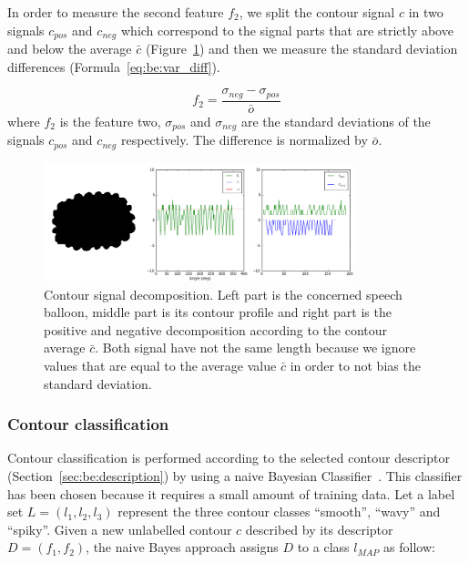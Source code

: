 In order to measure the second feature $f_2$, we split the contour signal $c$ in two signals $c_{pos}$ and $c_{neg}$ which correspond to the signal parts that are strictly above and below the average $\bar{c}$ (Figure~\ref{fig:be:signal_decomposition}) and then we measure the standard deviation differences (Formula~\ref{eq:be:var_diff}).%


\begin{equation}\label{eq:be:var_diff}
 f_2 = \frac{\sigma_{neg} - \sigma_{pos}}{\bar{o} }%
\end{equation}
where $f_2$ is the feature two, $\sigma_{pos}$ and $\sigma_{neg}$ are the standard deviations of the signals $c_{pos}$ and $c_{neg}$ respectively. The difference is normalized by $\bar{o}$.%


	\begin{figure}[!ht]	%
	  \centering
		\includegraphics[trim = 0mm 0mm 0mm 0mm, clip, width=340px]{signal_decomposition.png}
		\caption[Contour signal decomposition]{Contour signal decomposition. Left part is the concerned speech balloon, middle part is its contour profile and right part is the positive and negative decomposition according to the contour average $\bar{c}$. Both signal have not the same length because we ignore values that are equal to the average value $\bar{c}$ in order to not bias the standard deviation.}
		\label{fig:be:signal_decomposition}
	\end{figure}


\subsubsection{Contour classification}
Contour classification is performed according to the selected contour descriptor (Section~\ref{sec:be:description}) by using a naive Bayesian Classifier~\cite{Mitchell1997}.
This classifier has been chosen because it requires a small amount of training data.
Let a label set $L=(l_1,l_2,l_3)$ represent the three contour classes ``smooth'', ``wavy'' and ``spiky''.
Given a new unlabelled contour $c$ described by its descriptor $D=(f_1,f_2)$, the naive Bayes approach assigns $D$ to a class $l_{MAP}$ as follow:

